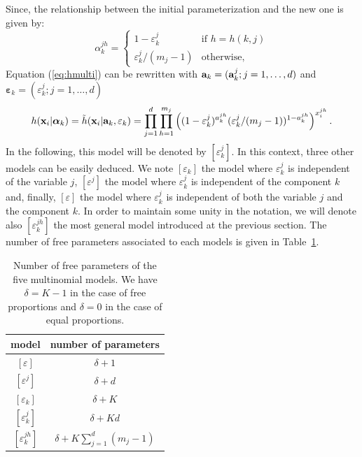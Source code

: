 \documentclass[12pt]{article}
\newcommand{\bx}{\mathbf{x}}
\newcommand{\balpha}{\boldsymbol{\alpha}}
\newcommand{\bvarepsilon}{\boldsymbol{\varepsilon}}
\begin{document}
Since, the relationship between the initial parameterization and the new one is given by:
\begin{equation}
  \alpha_k^{jh} = \left\{
    \begin{array}{ll}
      1-\varepsilon_k^j & \mbox{if $h=h(k,j)$} \\
      \varepsilon_k^j / (m_j-1) & \mbox{otherwise,}
    \end{array}
  \right.
\end{equation}
Equation (\ref{eq:hmulti}) can be rewritten with ${\bf a}_k = ({\bf a}_k^j ;
j=1,\ldots,d)$ and $\bvarepsilon_k = (\varepsilon_k^j ; j=1,\ldots,d)$
\begin{equation}
  h(\bx_i|\balpha_k) = \tilde h(\bx_i|{\bf a}_k,\varepsilon_k) =
  \prod_{j=1}^d \prod_{h=1}^{m_j} \left(
    (1-\varepsilon_k^j)^{a_k^{jh}} (\varepsilon_k^j /
    (m_j-1))^{1-a_k^{jh}} \right)^{x_i^{jh}}.
\end{equation}
In the following, this model will be denoted by $[\varepsilon_k^j]$. In this context, three
other models can be easily deduced. We note $[\varepsilon_k]$ the model where $\varepsilon_k^j$
is independent of the variable $j$, $[\varepsilon^j]$ the model where $\varepsilon_k^j$ is
independent of the component $k$ and, finally, $[\varepsilon]$ the model where
$\varepsilon_k^j$ is independent of both the variable $j$ and the component $k$.  In order to
maintain some unity in the notation, we will denote also $[\varepsilon_k^{jh}]$ the most
general model introduced at the previous section.  The number of free parameters associated to
each models is given in Table~\ref{tab:model.multi}.

\begin{table}[hbtp]
  \begin{center}
    \begin{tabular}{|c|c|}
      \hline model & number of parameters \\
      \hline $[\varepsilon]$ & $\delta + 1$ \\
      $[\varepsilon^j]$ & $\delta + d$ \\
      $[\varepsilon_k]$ & $\delta + K$ \\
      $[\varepsilon_k^j]$ & $\delta + Kd$ \\
      $[\varepsilon_k^{jh}]$ & $\delta + K \sum_{j=1}^d (m_j-1)$ \\
      \hline
    \end{tabular}
  \end{center}
  \caption{Number of free parameters of the five multinomial models. We have
    $\delta=K-1$ in the case of free proportions and $\delta=0$ in
    the case of equal proportions.} \label{tab:model.multi}
\end{table}
\end{document}
